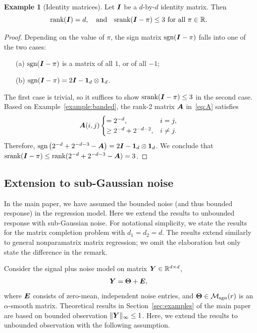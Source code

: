 \documentclass[11pt]{article}
\theoremstyle{plain}
\theoremstyle{definition}
\newtheorem{example}{Example}
\def\caliM{\tM_{\textup{sgn}}}
\def\sign{\textup{sgn}}
\def\srank{\textup{srank}}
\def\rank{\textup{rank}}
\def\caliM{\tM_{\textup{sgn}}}
\begin{document}
\begin{example}[Identity matrices]
Let $\bm I$ be a $d$-by-$d$ identity matrix. Then
\[
\rank(\mI)=d,\quad\text{and}\quad  \srank(\mI-\pi)\leq 3 \ \text{for all }\pi\in\mathbb{R}.
\]
\end{example}
\begin{proof}
Depending on the value of $\pi$, the sign matrix $\sign(\mI-\pi)$ falls into one of the two cases: 
\begin{enumerate}
\item[(a)] $\sign(\mI-\pi)$ is a matrix of all $1$, or of all $-1$; 
\item[(b)] $\sign(\mI-\pi)=2\mI-\mathbf{1}_d\otimes \mathbf{1}_d$.
\end{enumerate}
The first case is trivial, so it suffices to show $\srank(\mI-\pi)\leq 3$ in the second case. Based on Example~\ref{example:banded}, the rank-2 matrix $\bm A$ in~\eqref{eq:A} satisfies 
\[
\bm A(i,j)
\begin{cases}
=2^{-d}, & i=j,\\
\geq 2^{-d}+2^{-d-2}, & i\neq j.
\end{cases}
\]
Therefore, $\sign\left(2^{-d}+2^{-d-3}-\mA\right)=2\mI-\mathbf{1}_d\otimes \mathbf{1}_d$. We conclude that $\srank(\mI-\pi)\leq \rank(2^{-d}+2^{-d-3}-\mA)=3$. 
\end{proof}


\subsection{Extension to sub-Gaussian noise}\label{sec:sub-Gaussian}
In the main paper, we have assumed the bounded noise (and thus bounded response) in the regression model. Here we extend the results to unbounded response with sub-Gaussian noise. For notational simplicity, we state the results for the matrix completion problem with $d_1=d_2=d$. The results extend similarly to general nonparamatrix matrix regression; we omit the elaboration but only state the difference in the remark. 

Consider the signal plus noise model on matrix $\bm Y\in\mathbb{R}^{d\times d}$,
\begin{align*}
\bm Y = \bm{\Theta}+\bm{E},
\end{align*}
where $\bm{E}$ consists of zero-mean, independent noise entries, and $\mTheta\in\caliM(r)$ is an $\alpha$-smooth matrix.
Theoretical results in Section~\ref{sec:examples} of the main paper are based on bounded observation $\|\bm Y\|_\infty\leq 1$. Here, we extend the results to unbounded observation with the following assumption.
\end{document}
